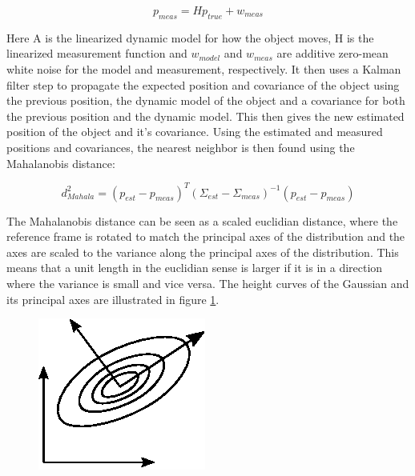 \begin{equation}
    p_{meas} = Hp_{true} + w_{meas}
\end{equation}
 
Here A is the linearized dynamic model for how the object moves, H is the linearized measurement function and $w_{model}$ and $w_{meas}$ are additive zero-mean white noise for the model and measurement, respectively. It then uses a Kalman filter step to propagate the expected position and covariance of the object using the previous position, the dynamic model of the object and a covariance for both the previous position and the dynamic model. This then gives the new estimated position of the object and it's covariance. Using the estimated and measured positions and covariances, the nearest neighbor is then found using the Mahalanobis distance\cite{MahalanobisTracking}:

\begin{equation}
    d^2_{Mahala} = (p_{est} - p_{meas})^T(\Sigma_{est} - \Sigma_{meas})^{-1}(p_{est} - p_{meas})
\end{equation}

The Mahalanobis distance can be seen as a scaled euclidian distance, where the reference frame is rotated to match the principal axes of the distribution and the axes are scaled to the variance along the principal axes of the distribution. This means that a unit length in the euclidian sense is larger if it is in a direction where the variance is small and vice versa. The height curves of the Gaussian and its principal axes are illustrated in figure \ref{Fig:GaussianPrincipalAxes}. \\

\begin{figure}
    \centering
    \includegraphics[width=0.5\linewidth]{0_Images/3_Theory/GaussianPrincipalAxis.eps}
    \label{Fig:GaussianPrincipalAxes}
\end{figure}

